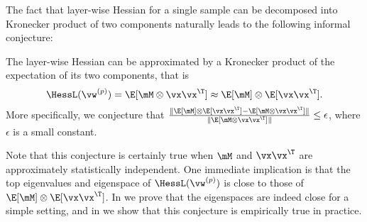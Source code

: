 \label{sec:hessian}
The fact that layer-wise Hessian for a single sample can be decomposed into Kronecker product of two components naturally leads to the following informal conjecture:
\begin{conjecture} The layer-wise Hessian can be approximated by a Kronecker product of the expectation of its two components, that is
\begin{equation}
    \HessL(\vw^{(p)}) = \E[\mM\otimes \vx\vx^\T] \approx \E[\mM] \otimes \E[\vx\vx^\T].
    \label{eqn:decouple}
\end{equation}
More specifically, we conjecture that 
$\frac{\|\E[\mM] \otimes \E[\vx\vx^\T]-\E[\mM\otimes \vx\vx^\T]\|}{\|\E[\mM\otimes \vx\vx^\T]\|} \leq \epsilon$,
where $\epsilon$ is a small constant.
\end{conjecture}
Note that this conjecture is certainly true when $\mM$ and $\vx\vx^\T$ are approximately statistically independent. One immediate implication is that the top eigenvalues and eigenspace of $\HessL(\vw^{(p)})$ is close to those of $\E[\mM] \otimes \E[\vx\vx^\T]$. In  we prove that the eigenspaces are indeed close for a simple setting, and in  we show that this conjecture is empirically true in practice.

